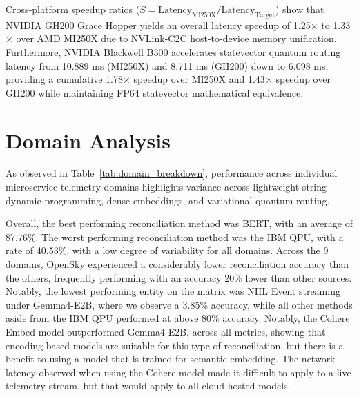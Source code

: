 \documentclass[journal]{IEEEtran}
\begin{document}
Cross-platform speedup ratios ($S = \text{Latency}_{\text{MI250X}} / \text{Latency}_{\text{Target}}$) show that NVIDIA GH200 Grace Hopper yields an overall latency speedup of 1.25$\times$ to 1.33$\times$ over AMD MI250X due to NVLink-C2C host-to-device memory unification. Furthermore, NVIDIA Blackwell B300 accelerates statevector quantum routing latency from 10.889 ms (MI250X) and 8.711 ms (GH200) down to 6.098 ms, providing a cumulative 1.78$\times$ speedup over MI250X and 1.43$\times$ speedup over GH200 while maintaining FP64 statevector mathematical equivalence.


\section{Domain Analysis}
As observed in Table~\ref{tab:domain_breakdown}, performance across individual microservice telemetry domains highlights variance across lightweight string dynamic programming, dense embeddings, and variational quantum routing.

Overall, the best performing reconciliation method was BERT, with an average of 87.76\%. The worst performing reconciliation method was the IBM QPU, with a rate of 40.53\%, with a low degree of variability for all domains. Across the 9 domains, OpenSky experienced a considerably lower reconciliation accuracy than the others, frequently performing with an accuracy 20\% lower than other sources. Notably, the lowest performing entity on the matrix was NHL Event streaming under Gemma4-E2B, where we observe a 3.85\% accuracy, while all other methods aside from the IBM QPU performed at above 80\% accuracy. Notably, the Cohere Embed model outperformed Gemma4-E2B, across all metrics, showing that encoding based models are suitable for this type of reconciliation, but there is a benefit to using a model that is trained for semantic embedding. The network latency observed when using the Cohere model made it difficult to apply to a live telemetry stream, but that would apply to all cloud-hosted models.
\end{document}
